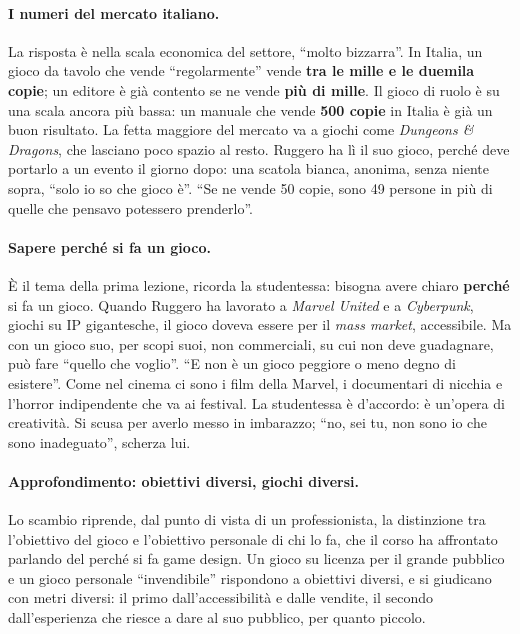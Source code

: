 \paragraph{I numeri del mercato italiano.} La risposta è nella scala economica del
settore, ``molto bizzarra''. In Italia, un gioco da tavolo che vende ``regolarmente''
vende \textbf{tra le mille e le duemila copie}; un editore è già contento se ne vende
\textbf{più di mille}. Il gioco di ruolo è su una scala ancora più bassa: un manuale che
vende \textbf{500 copie} in Italia è già un buon risultato. La fetta maggiore del mercato
va a giochi come \emph{Dungeons \& Dragons}, che lasciano poco spazio al resto. Ruggero
ha lì il suo gioco, perché deve portarlo a un evento il giorno dopo: una scatola
bianca, anonima, senza niente sopra, ``solo io so che gioco è''. ``Se ne vende 50 copie,
sono 49 persone in più di quelle che pensavo potessero prenderlo''.

\paragraph{Sapere perché si fa un gioco.} È il tema della prima lezione, ricorda la
studentessa: bisogna avere chiaro \textbf{perché} si fa un gioco. Quando Ruggero ha
lavorato a \emph{Marvel United} e a \emph{Cyberpunk}, giochi su IP gigantesche, il gioco
doveva essere per il \emph{mass market}, accessibile. Ma con un gioco suo, per scopi
suoi, non commerciali, su cui non deve guadagnare, può fare ``quello che voglio''. ``E
non è un gioco peggiore o meno degno di esistere''. Come nel cinema ci sono i film della
Marvel, i documentari di nicchia e l'horror indipendente che va ai festival. La
studentessa è d'accordo: è un'opera di creatività. Si scusa per averlo messo in
imbarazzo; ``no, sei tu, non sono io che sono inadeguato'', scherza lui.

\paragraph{Approfondimento: obiettivi diversi, giochi diversi.} Lo scambio riprende, dal
punto di vista di un professionista, la distinzione tra l'obiettivo del gioco e
l'obiettivo personale di chi lo fa, che il corso ha affrontato parlando del perché si
fa game design. Un gioco su licenza per il grande pubblico e un gioco personale
``invendibile'' rispondono a obiettivi diversi, e si giudicano con metri diversi: il
primo dall'accessibilità e dalle vendite, il secondo dall'esperienza che riesce a dare
al suo pubblico, per quanto piccolo.

